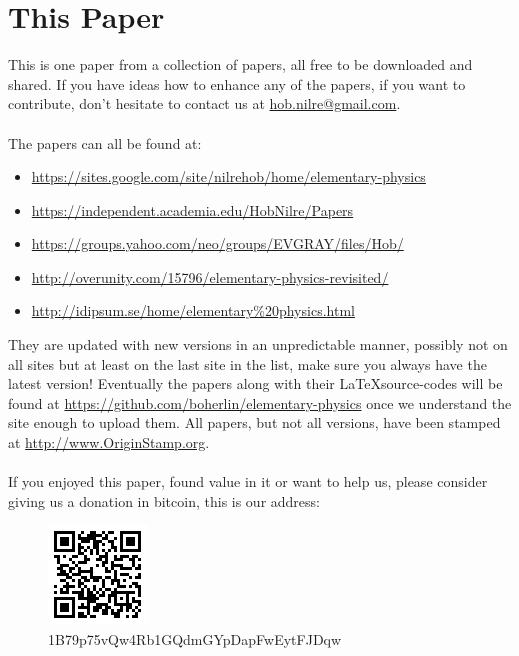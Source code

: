 \section{This Paper}

This is one paper from a collection of papers, all free to be downloaded and shared. If you have ideas how to enhance any of the papers, if you want to contribute, don’t hesitate to contact us at \url{hob.nilre@gmail.com}.\\
\\
The papers can all be found at:
\begin{itemize}
\item \url{https://sites.google.com/site/nilrehob/home/elementary-physics}
\item \url{https://independent.academia.edu/HobNilre/Papers}
\item \url{https://groups.yahoo.com/neo/groups/EVGRAY/files/Hob/}
\item \url{http://overunity.com/15796/elementary-physics-revisited/}
\item \url{http://idipsum.se/home/elementary%20physics.html}
\end{itemize}

They are updated with new versions in an unpredictable manner, possibly not on all sites but at least on the last site in the list, make sure you always have the latest version!
Eventually the papers along with their \LaTeX source-codes will be found at \url{https://github.com/boherlin/elementary-physics} once we understand the site enough to upload them.
All papers, but not all versions, have been stamped at \url{http://www.OriginStamp.org}.\\
\\
If you enjoyed this paper, found value in it or want to help us, please consider giving us a donation in bitcoin, this is our address:

\begin{figure}[ht] \centering
	\includegraphics[]{../common/1B79p75vQw4Rb1GQdmGYpDapFwEytFJDqw} \caption{1B79p75vQw4Rb1GQdmGYpDapFwEytFJDqw}
\end{figure}

